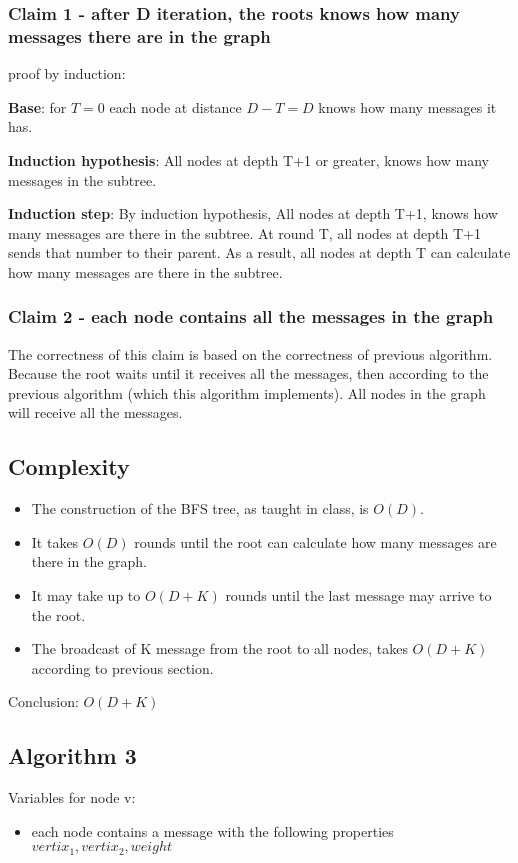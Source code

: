 \documentclass[11pt]{article}
\begin{document}
\subsubsection{Claim 1 - after D iteration, the roots knows how many messages there are in the graph}
proof by induction: 

\textbf{Base}: for $T=0$ each node at distance $D-T=D$ knows how many messages it has.

\textbf{Induction hypothesis}: All nodes at depth T+1 or greater, knows how many messages in the subtree.

\textbf{Induction step}: By induction hypothesis, All nodes at depth T+1, knows how many messages are there in the subtree. At round T, all nodes at depth T+1 sends that number to their parent. As a result, all nodes at depth T can calculate how many messages are there in the subtree.

\subsubsection{Claim 2 - each node contains all the messages in the graph}
The correctness of this claim is based on the correctness of previous algorithm. Because the root waits until it receives all the messages, then according to the previous algorithm (which this algorithm implements). All nodes in the graph will receive all the messages.

\subsection*{Complexity}
\begin{itemize}
    \item The construction of the BFS tree, as taught in class, is $O(D)$.
    \item It takes $O(D)$ rounds until the root can calculate how many messages are there in the graph.
    \item It may take up to $O(D + K)$ rounds until the last message may arrive to the root.
    \item The broadcast of K message from the root to all nodes, takes $O(D+K)$ according to previous section.
\end{itemize}
Conclusion: $O(D+K)$

\subsection{Algorithm 3}

Variables for node v:
\begin{itemize}
    \item each node contains a message with the following properties ${vertix_1, vertix_2, weight}$
\end{itemize}
\begin{algorithmic}[1]
\end{algorithmic}
\end{document}
